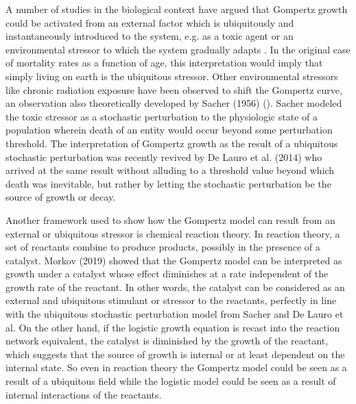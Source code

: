 \documentclass{article}
\begin{document}
A number of studies in the biological context have argued that Gompertz growth could be activated from an external factor which is ubiquitously and instantaneously introduced to the system, e.g. as a toxic agent or an environmental stressor to which the system gradually adapts \cite{neafsey1988gompertz,neafsey1989gompertz,thompson1990biphasic}. In the original case of mortality rates as a function of age, this interpretation would imply that simply living on earth is the ubiquitous stressor. Other environmental stressors like chronic radiation exposure have been observed to shift the Gompertz curve, an observation also theoretically developed by Sacher (1956) (\cite{sacher1956statistical}). Sacher modeled the toxic stressor as a stochastic perturbation to the physiologic state of a population wherein death of an entity would occur beyond some perturbation threshold. The interpretation of Gompertz growth as the result of a ubiquitous stochastic perturbation was recently revived by De Lauro et al. (2014) \cite{de2014stochastic} who arrived at the same result without alluding to a threshold value beyond which death was inevitable, but rather by letting the stochastic perturbation be the source of growth or decay.

Another framework used to show how the Gompertz model can result from an external or ubiquitous stressor is chemical reaction theory. In reaction theory, a set of reactants combine to produce products, possibly in the presence of a catalyst. Morkov (2019) \cite{markov2019reaction} showed that the Gompertz model can be interpreted as growth under a catalyst whose effect diminishes at a rate independent of the growth rate of the reactant. In other words, the catalyst can be considered as an external and ubiquitous stimulant or stressor to the reactants, perfectly in line with the ubiquitous stochastic perturbation model from Sacher and De Lauro et al. On the other hand, if the logistic growth equation is recast into the reaction network equivalent, the catalyst is diminished by the growth of the reactant, which suggests that the source of growth is internal or at least dependent on the internal state. So even in reaction theory the Gompertz model could be seen as a result of a ubiquitous field while the logistic model could be seen as a result of internal interactions of the reactants. 
\end{document}
